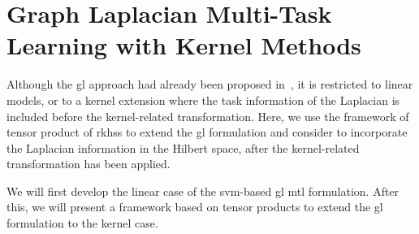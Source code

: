 \section{Graph Laplacian Multi-Task Learning with Kernel Methods}\label{sec:graphlap}

Although the \acrshort{gl} approach had already been proposed in~\citet{EvgeniouMP05}, it is restricted to linear models, or to a kernel extension where the task information of the Laplacian is included before the kernel-related transformation.
Here, we use the framework of tensor product of \acrshort{rkhss} to extend the \acrshort{gl} formulation and consider to incorporate the Laplacian information in the Hilbert space, after the kernel-related transformation has been applied.

We will first develop the linear case of the \acrshort{svm}-based \acrshort{gl} \acrshort{mtl} formulation. After this, we will present a framework based on tensor products to extend the \acrshort{gl} formulation to the kernel case.


